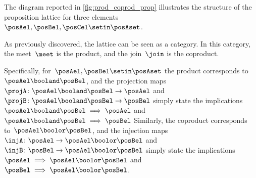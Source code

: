 The diagram reported in \cref{fig:prod_coprod_prop} illustrates the structure of the proposition lattice for three elements~$\posAel,\posBel,\posCel\setin \posAset$.

As previously discovered, the lattice can be seen as a category.
In this category, the meet~$\meet$ is the product, and the join~$\join$ is the coproduct.

Specifically, for~$\posAel,\posBel\setin \posAset$ the product corresponds to~$\posAel\booland \posBel$, and the projection maps~$\projA\colon \posAel\booland \posBel\to \posAel$ and~$\projB\colon \posAel\booland \posBel\to \posBel$ simply state the implications~$\posAel \booland \posBel \implies \posAel$ and~$\posAel \booland \posBel \implies \posBel$
Similarly, the coproduct corresponds to~$\posAel\boolor \posBel$, and the injection maps~$\injA\colon \posAel\to \posAel\boolor \posBel$ and~$\injB\colon \posBel\to \posAel\boolor \posBel$ simply state the implications~$\posAel \implies \posAel \boolor \posBel$ and~$\posBel \implies \posAel \boolor \posBel$.
